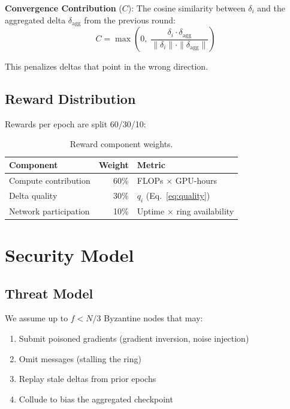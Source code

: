 \documentclass[11pt,letterpaper]{article}
\begin{document}
\textbf{Convergence Contribution} ($C$): The cosine similarity between $\delta_i$ and the aggregated delta $\delta_{\text{agg}}$ from the previous round:
\begin{equation}
    C = \max\!\left(0, \; \frac{\delta_i \cdot \delta_{\text{agg}}}{\|\delta_i\| \cdot \|\delta_{\text{agg}}\|}\right)
\end{equation}

This penalizes deltas that point in the wrong direction.

\subsection{Reward Distribution}

Rewards per epoch are split 60/30/10:

\begin{table}[t]
\centering
\begin{tabular}{lrl}
\toprule
\textbf{Component} & \textbf{Weight} & \textbf{Metric} \\
\midrule
Compute contribution & 60\% & FLOPs $\times$ GPU-hours \\
Delta quality & 30\% & $q_i$ (Eq.~\ref{eq:quality}) \\
Network participation & 10\% & Uptime $\times$ ring availability \\
\bottomrule
\end{tabular}
\caption{Reward component weights.}
\label{tab:rewards}
\end{table}

\section{Security Model}
\label{sec:security}

\subsection{Threat Model}

We assume up to $f < N/3$ Byzantine nodes that may:
\begin{enumerate}
    \item Submit poisoned gradients (gradient inversion, noise injection)
    \item Omit messages (stalling the ring)
    \item Replay stale deltas from prior epochs
    \item Collude to bias the aggregated checkpoint
\end{enumerate}
\end{document}
